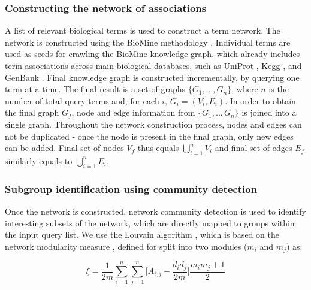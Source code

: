 \documentclass[oribibl,runningheads,a4paper]{llncs}
\begin{document}
\subsubsection{Constructing the network of associations}
A list of relevant biological terms is used to construct a term network. The network is constructed using the BioMine methodology \cite{eronen2012biomine}. Individual terms are used as seeds for crawling the BioMine knowledge graph, which already includes term associations across main biological databases, such as UniProt \cite{uniprot2014uniprot}, Kegg \cite{kanehisa2000kegg}, and GenBank \cite{benson2012genbank}. Final knowledge graph is constructed incrementally, by querying one term at a time. The final result is a set of graphs $\{G_1,\dots, G_n\}$, where $n$ is the number of total query terms and, for each $i$, $G_i=(V_i, E_i)$. In order to obtain the final graph $G_f$, node and edge information from $\{G_{1},..,G_{n}\}$ is joined into a single graph. Throughout the network construction process, nodes and edges can not be duplicated - once the node is present in the final graph, only new edges can be added. Final set of nodes $V_{f}$ thus equals $\bigcup_{i=1}^{n}V_{i}$ and final set of edges $E_{f}$ similarly equals to $\bigcup_{i=1}^{n} E_{i}$. 


\subsubsection{Subgroup identification using community detection}

Once the network is constructed, network community detection is used to identify interesting subsets of the network, which are directly mapped to groups within the input query list. We use the Louvain algorithm \cite{blondel2011louvain}, which is based on the network modularity measure \cite{newman2006modularity},  defined for split into two modules ($m_{i}$ and $m_{j}$) as:

\begin{equation}
\xi = \frac{1}{2m}\sum_{i=1}^n\sum_{j=1}^n \bigg[A_{i,j} - \frac{d_{i}d_{j}}{2m} \bigg]\frac{m_{i}m_{j}+1}{2}
\end{equation}
\end{document}
